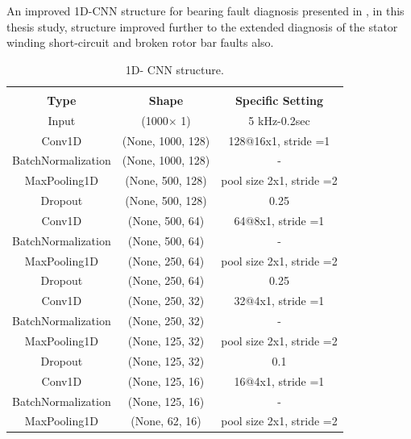 An improved 1D-CNN structure for bearing fault diagnosis presented in \cite{chen2021improved}, in this thesis study, structure improved further to the extended diagnosis of the stator winding short-circuit and broken rotor bar faults also.

\begin{table}[h]
	{\setlength{\tabcolsep}{12pt}
 		\caption{1D- CNN structure.}
 		\begin{center}
 			\vspace{-6mm}
			\begin{tabular}{ccc}
				\hline \\[-2.45ex] \hline \\[-2.1ex]
			\textbf{Type}               & \textbf{Shape}             & \textbf{Specific Setting} \\
				\hline	
			Input              & (1000$\times$ 1)   & 5 kHz-0.2sec             \\				
			Conv1D             & (None, 1000, 128) & 128@16x1, stride =1      \\
			BatchNormalization & (None, 1000, 128) & -                        \\
			MaxPooling1D       & (None, 500, 128)  & pool size 2x1, stride =2 \\
			Dropout            & (None, 500, 128)  & 0.25                     \\
			Conv1D             & (None, 500, 64)   & 64@8x1, stride =1        \\
			BatchNormalization & (None, 500, 64)   & -                        \\
			MaxPooling1D       & (None, 250, 64)   & pool size 2x1, stride =2 \\
			Dropout            & (None, 250, 64)   & 0.25                     \\
			Conv1D             & (None, 250, 32)   & 32@4x1, stride =1        \\
			BatchNormalization & (None, 250, 32)   & -                        \\
			MaxPooling1D       & (None, 125, 32)   & pool size 2x1, stride =2 \\
			Dropout            & (None, 125, 32)   & 0.1                      \\
			Conv1D             & (None, 125, 16)   & 16@4x1, stride =1        \\
			BatchNormalization & (None, 125, 16)   & -                        \\
			MaxPooling1D       & (None, 62, 16)    & pool size 2x1, stride =2 \\

\end{tabular}
\end{center}}
\end{table}
